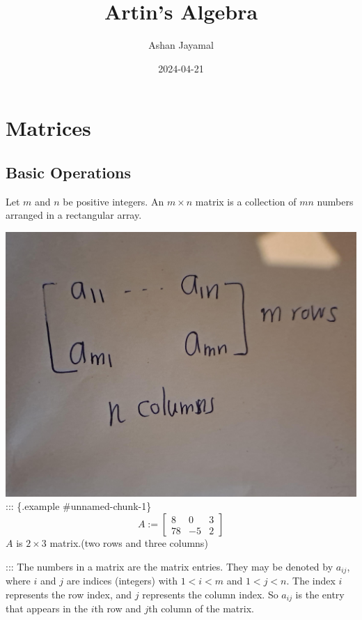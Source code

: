 \documentclass[
]{book}
\title{Artin's Algebra}
\author{Ashan Jayamal}
\date{2024-04-21}
\theoremstyle{definition}
\theoremstyle{definition}
\theoremstyle{definition}
\theoremstyle{definition}
\theoremstyle{remark}
\begin{document}
\maketitle

{
\setcounter{tocdepth}{1}
\tableofcontents
}
\hypertarget{matrices}{%
\chapter{Matrices}\label{matrices}}

\hypertarget{basic-operations}{%
\section{Basic Operations}\label{basic-operations}}

Let \(m\) and \(n\) be positive integers. An \(m \times n\) matrix is a collection of \(mn\) numbers arranged in a rectangular array.

\includegraphics{figures/ch_1/fig01.jpg}
::: \{.example \#unnamed-chunk-1\}
\[A:=\begin{bmatrix}
8 & 0 & 3\\
78 & -5 & 2
\end{bmatrix}\]
\(A\) is \(2 \times 3\) matrix.(two rows and three columns)

:::
The numbers in a matrix are the matrix entries. They may be denoted by \(a_{ij}\), where \(i\) and \(j\) are indices (integers) with \(1 < i < m\) and \(1 < j < n\). The index \(i\) represents the row index, and \(j\) represents the column index. So \(a_{ij}\) is the entry that appears in the \(i\)th row and \(j\)th column of the matrix.
\end{document}
